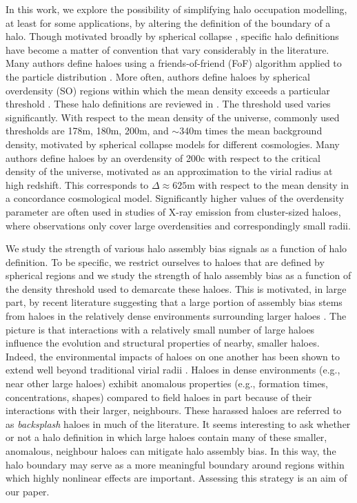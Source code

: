 \documentclass[usenatbib,fleqn]{mnras}
\begin{document}
In this work, we explore the possibility of simplifying halo occupation modelling, at least for some applications, by altering the definition of the boundary of a halo. Though motivated broadly by spherical collapse \citep{gunn_gott72, fillmore_goldreich84, ryden_gunn87, lacey_cole93, eke_etal96, mota_vandebruck04, pace_etal10}, specific halo definitions have become a matter of convention that vary considerably in the literature. Many authors define haloes using a friends-of-friend (FoF) algorithm applied to the particle distribution \citep[e.g., ][]{davis_etal85}. More often, authors define haloes by spherical overdensity (SO) regions within which the mean density exceeds a particular threshold \citep[e.g., ][]{lacey_cole93}. These halo definitions are reviewed in \citet[][and references therein]{knebe_etal11}. The threshold used varies significantly. With respect to the mean density of the universe, commonly used thresholds are 178m, 180m, 200m, and $\sim$340m times the mean background density, motivated by spherical collapse models for different cosmologies. Many authors define haloes by an overdensity of 200c with respect to the critical density of the universe, motivated as an approximation to the virial radius at high redshift. This corresponds to $\Delta \approx 625$m with respect to the mean density in a concordance cosmological model. Significantly higher values of the overdensity parameter are often used in studies of X-ray emission from cluster-sized haloes, where observations only cover large overdensities and correspondingly small radii.

We study the strength of various halo assembly bias signals as a function of halo definition. To be specific, we restrict ourselves to haloes that are defined by spherical regions and we study the strength of halo assembly bias as a function of the density threshold used to demarcate these haloes. This is motivated, in large part, by recent literature suggesting that a large portion of assembly bias stems from haloes in the relatively dense environments surrounding larger haloes \citep{wang_etal07,warnick_etal08,hahn_etal09,ludlow_etal09,lacerna_padilla11,more_etal15,sunayama_etal16}. The picture is that interactions with a relatively small number of large haloes influence the evolution and structural properties of nearby, smaller haloes. Indeed, the environmental impacts of haloes on one another has been shown to extend well beyond traditional virial radii \citep{wetzel_etal14, diemer_kravtsov14, behroozi_etal13b, adhikari_etal14, wetzel_nagai15, more_etal15, hearin_etal16}. Haloes in dense environments (e.g., near other large haloes) exhibit anomalous properties (e.g., formation times, concentrations, shapes) compared to field haloes in part because of their interactions with their larger, neighbours. These harassed haloes are referred to as {\em backsplash} haloes in much of the literature. It seems interesting to ask whether or not a halo definition in which large haloes contain many of these smaller, anomalous, neighbour haloes can mitigate halo assembly bias. In this way, the halo boundary may serve as a more meaningful boundary around regions within which highly nonlinear effects are important. Assessing this strategy is an aim of our paper. 
\end{document}
